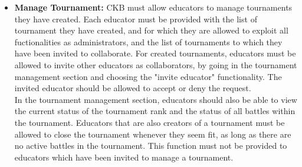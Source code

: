 \documentclass[a4paper, 11pt, titlepage]{article}
\begin{document}
\begin{itemize}
    \item \textbf{Manage Tournament:} CKB must allow educators to manage tournaments they have created. Each educator must be provided with
    the list of tournament they have created, and for which they are allowed to exploit all fuctionalities as administrators, and the list of tournaments to which they
    have been invited to collaborate. For created tournaments, educators must be allowed to invite other educators as collaborators, by going in the tournament management section and choosing the
    "invite educator" functionality. The invited educator should be allowed to accept or deny the request.\\ In the tournament management section, educators should also be able to view the current status of the tournament rank and the status of all battles within the tournament.
    Educators that are also creators of a tournament must be allowed to close the tournament whenever they seem fit, as long as there are no active battles in the tournament. This function must not be provided to 
    educators which have been invited to manage a tournament.  


\end{itemize}
\end{document}
